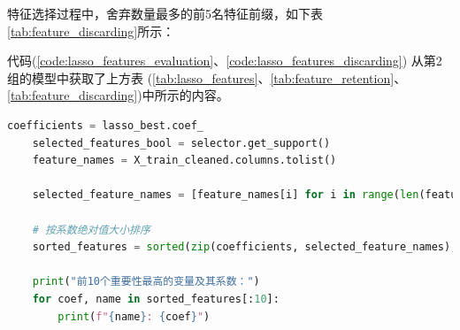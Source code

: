 \documentclass[
    report,     %
    oneside,    %
    UTF8,       %
    zihao=-4    %
]{config} %
\begin{document}
特征选择过程中，舍弃数量最多的前5名特征前缀，如下表\ref{tab:feature_discarding}所示：
\begin{table}[htbp]
    \centering
    \caption{Lasso舍弃数量最多的前5名特征前缀}
    \label{tab:feature_discarding}
\end{table}

代码(\ref{code:lasso_features_evaluation}、\ref{code:lasso_features_discarding})
从第2组的模型中获取了上方表
(\ref{tab:lasso_features}、\ref{tab:feature_retention}、\ref{tab:feature_discarding})中所示的内容。
\begin{lstlisting}[label=code:lasso_features_evaluation, language=Python, caption=Lasso：重要性排名前10的变量及其系数]
    coefficients = lasso_best.coef_
    selected_features_bool = selector.get_support()
    feature_names = X_train_cleaned.columns.tolist()

    selected_feature_names = [feature_names[i] for i in range(len(feature_names)) if selected_features_bool[i]]

    # 按系数绝对值大小排序
    sorted_features = sorted(zip(coefficients, selected_feature_names), key=lambda x: abs(x[0]), reverse=True)

    print("前10个重要性最高的变量及其系数：")
    for coef, name in sorted_features[:10]:
        print(f"{name}: {coef}")
\end{lstlisting}
\end{document}
